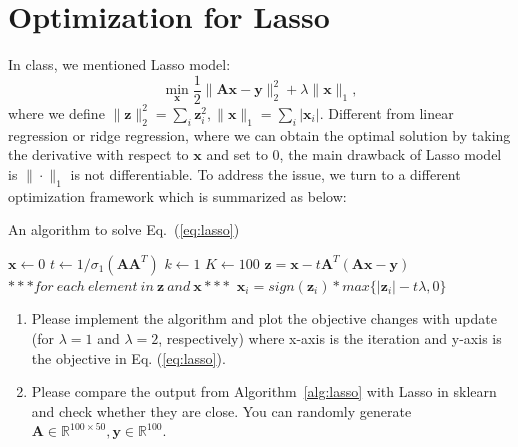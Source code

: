 \documentclass[11pt]{article}
\newcommand{\R}{\mathbb{R}}
\newcommand{\mtx}[1]{\mathbf{#1}}
\newcommand{\vct}[1]{\mathbf{#1}}
\def \mA {\mtx{A}}
\def \vx {\vct{x}}
\def \vy {\vct{y}}
\def \vz {\vct{z}}
\def \R {\mathbb{R}}
\begin{document}
 \section*{Optimization for Lasso}
 In class, we mentioned Lasso model:
 \begin{equation}\label{eq:lasso}
 	\min\limits_{\vx} \frac12\|\mA\vx-\vy\|_2^2+\lambda\|\vx\|_1,
 \end{equation}
where we define $\|\vz\|_2^2=\sum\limits_i\vz_i^2, \|\vx\|_1=\sum\limits_i|\vx_i|$. Different from linear regression or ridge regression, where we can obtain the optimal solution by taking the derivative with respect to $\vx$ and set to 0, the main drawback of Lasso model is $\|\cdot\|_1$ is not differentiable. To address the issue, we turn to a different optimization framework which is summarized as below:
\begin{algorithm}
	\caption{An algorithm to solve Eq.~(\ref{eq:lasso})}\label{alg:lasso}
	\begin{algorithmic}
		\State $\vx \gets 0$
		\State $t \gets 1/\sigma_1(\mA\mA^T)$
		\State $k \gets 1$
		\State $K \gets 100$
		\State $\vz=\vx-t\mA^T(\mA\vx-\vy)$
		\State $***for \ each \ element \ in \ \vz \ and \ \vx***$  %
		\State $\vx_i=sign(\vz_i)*max\{|\vz_i|-t\lambda,0\}$
		\EndWhile
	\end{algorithmic}
\end{algorithm}
\begin{enumerate}
	\item Please implement the algorithm and plot the objective changes with update (for $\lambda=1$ and $\lambda=2$, respectively) where x-axis is the iteration and y-axis is the objective in Eq. (\ref{eq:lasso}).
	\item Please compare the output from Algorithm~\ref{alg:lasso}  with Lasso in sklearn and check whether they are close. You can randomly generate $\mA\in\R^{100\times 50}, \vy\in\R^{100}$.
\end{enumerate}
\end{document}
